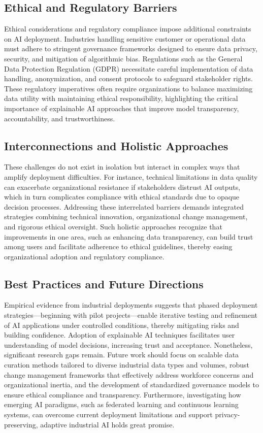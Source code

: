 \documentclass[sigconf]{acmart}
\begin{document}
\subsection{Ethical and Regulatory Barriers}

Ethical considerations and regulatory compliance impose additional constraints on AI deployment. Industries handling sensitive customer or operational data must adhere to stringent governance frameworks designed to ensure data privacy, security, and mitigation of algorithmic bias. Regulations such as the General Data Protection Regulation (GDPR) necessitate careful implementation of data handling, anonymization, and consent protocols to safeguard stakeholder rights. These regulatory imperatives often require organizations to balance maximizing data utility with maintaining ethical responsibility, highlighting the critical importance of explainable AI approaches that improve model transparency, accountability, and trustworthiness.

\subsection{Interconnections and Holistic Approaches}

These challenges do not exist in isolation but interact in complex ways that amplify deployment difficulties. For instance, technical limitations in data quality can exacerbate organizational resistance if stakeholders distrust AI outputs, which in turn complicates compliance with ethical standards due to opaque decision processes. Addressing these interrelated barriers demands integrated strategies combining technical innovation, organizational change management, and rigorous ethical oversight. Such holistic approaches recognize that improvements in one area, such as enhancing data transparency, can build trust among users and facilitate adherence to ethical guidelines, thereby easing organizational adoption and regulatory compliance.

\subsection{Best Practices and Future Directions}

Empirical evidence from industrial deployments suggests that phased deployment strategies—beginning with pilot projects—enable iterative testing and refinement of AI applications under controlled conditions, thereby mitigating risks and building confidence. Adoption of explainable AI techniques facilitates user understanding of model decisions, increasing trust and acceptance. Nonetheless, significant research gaps remain. Future work should focus on scalable data curation methods tailored to diverse industrial data types and volumes, robust change management frameworks that effectively address workforce concerns and organizational inertia, and the development of standardized governance models to ensure ethical compliance and transparency. Furthermore, investigating how emerging AI paradigms, such as federated learning and continuous learning systems, can overcome current deployment limitations and support privacy-preserving, adaptive industrial AI holds great promise.
\end{document}
